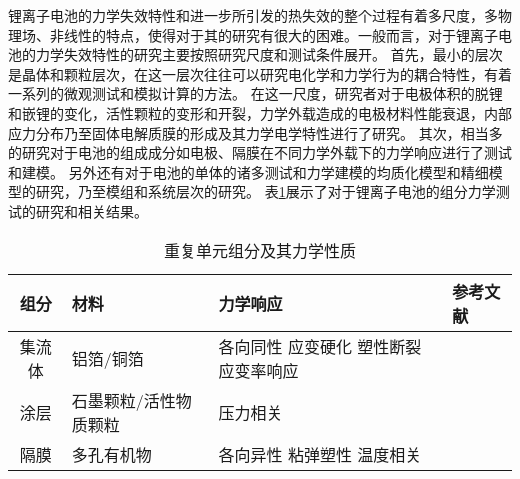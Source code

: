 \indent 锂离子电池的力学失效特性和进一步所引发的热失效的整个过程有着多尺度，多物理场、非线性的特点，使得对于其的研究有很大的困难。一般而言，对于锂离子电池的力学失效特性的研究主要按照研究尺度和测试条件展开。 首先，最小的层次是晶体和颗粒层次，在这一层次往往可以研究电化学和力学行为的耦合特性，有着一系列的微观测试和模拟计算的方法。 在这一尺度，研究者对于电极体积的脱锂和嵌锂的变化，活性颗粒的变形和开裂，力学外载造成的电极材料性能衰退，内部应力分布乃至固体电解质膜的形成及其力学电学特性\cite{Behrou2017Multiscale,Behrou2017Numerical,Zhao2012Fracture,Zhao2010Fracture}进行了研究。 其次，相当多的研究对于电池的组成成分如电极、隔膜在不同力学外载下的力学响应\cite{Cannarella2014Mechanical,Zhang2016Li,Kalnaus2017Mechanical,Sheidaei2011Mechanical}进行了测试和建模。 另外还有对于电池的单体的诸多测试和力学建模的均质化模型和精细模型的研究\cite{Elham2012Calibration,Greve2012Mechanical,Sahraei2012Modeling,Sahraei2014Characterizing}，乃至模组和系统层次的研究\cite{Ali2015Computational,Wang2017Progressive,Xia2014Damage,Kukreja2016Crash}。 
表\ref{tab:component}展示了对于锂离子电池的组分力学测试的研究和相关结果。
\begin{table}
    \centering
    \caption{重复单元组分及其力学性质}
    \label{tab:component}
    \begin{tabular}{ | c | p{1.8cm} | p{1.8cm} | p{0.5cm}|}
    \hline
    组分 & 材料 & 力学响应 & 参考文献 \\ \hline
    集流体 & 铝箔/铜箔 & 各向同性 应变硬化 塑性断裂 应变率响应 & \cite{Sahraei2016Microscale} \quad \quad  \cite{Sahraei2015Modelling} \quad \quad \cite{Greve2012Mechanical} \quad \quad \cite{Luo2015Fracture} \\
    涂层 & 石墨颗粒/活性物质颗粒 & 压力相关 & \cite{Dass} \\
    隔膜 & 多孔有机物 & 各向异性 粘弹塑性 温度相关  &  \cite{Huang2011Separator} \quad \quad \cite{Lee2014A} \quad \quad \cite{Zhang2016Deformation} \\ \hline
    \end{tabular}
\end{table}
